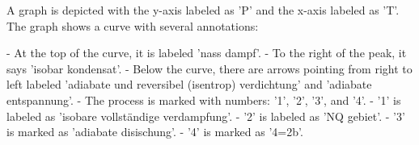 A graph is depicted with the y-axis labeled as 'P' and the x-axis labeled as 'T'. The graph shows a curve with several annotations:

- At the top of the curve, it is labeled 'nass dampf'.
- To the right of the peak, it says 'isobar kondensat'.
- Below the curve, there are arrows pointing from right to left labeled 'adiabate und reversibel (isentrop) verdichtung' and 'adiabate entspannung'.
- The process is marked with numbers: '1', '2', '3', and '4'.
- '1' is labeled as 'isobare vollständige verdampfung'.
- '2' is labeled as 'NQ gebiet'.
- '3' is marked as 'adiabate disischung'.
- '4' is marked as '4=2b'.